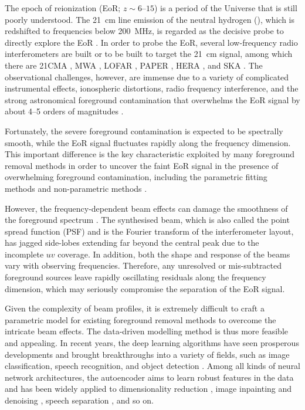 \documentclass[letters,a4paper,fleqn,usenatbib]{mnras}
\newcommand{\Hi}{\ion{H}{i}}
\begin{document}
The epoch of reionization (EoR; $z \sim \numrange{6}{15}$) is a period
of the Universe that is still poorly understood.
The \SI{21}{\cm} line emission of the neutral hydrogen (\Hi), which is
redshifted to frequencies below \SI{200}{\MHz}, is regarded as the
decisive probe to directly explore the EoR
\citep[see][for reviews]{furlanetto2006rev,furlanetto2016rev}.
In order to probe the EoR, several low-frequency radio interferometers
are built or to be built to target the \SI{21}{\cm} signal, among which
there are 21CMA \citep{zheng2016}, MWA \citep{tingay2013},
LOFAR \citep{vanHaarlem2013}, PAPER \citep{parsons2010},
HERA \citep{deboer2017}, and SKA \citep{koopmans2015rev}.
The observational challenges, however, are immense due to a variety of
complicated instrumental effects, ionospheric distortions, radio frequency
interference, and the strong astronomical foreground contamination that
overwhelms the EoR signal by about \numrange{4}{5} orders of magnitudes
\citep[see][for a review]{morales2010rev}.

Fortunately, the severe foreground contamination is expected to be
spectrally smooth, while the EoR signal fluctuates rapidly along the
frequency dimension.
This important difference is the key characteristic exploited by many
foreground removal methods in order to uncover the faint EoR signal in
the presence of overwhelming foreground contamination, including the
parametric fitting methods \citep[e.g.,][]{wang2006,liu2009fgrm,wang2013}
and non-parametric methods \citep[e.g.,][]{harker2009,chapman2013,mertens2018}.

However, the frequency-dependent beam effects can damage the smoothness
of the foreground spectrum \citep{liu2009ps}.
The synthesised beam, which is also called the point spread function (PSF)
and is the Fourier transform of the interferometer layout, has jagged
side-lobes extending far beyond the central peak due to the incomplete
$uv$ coverage.
In addition, both the shape and response of the beams vary with
observing frequencies.
Therefore, any unresolved or mis-subtracted foreground sources leave
rapidly oscillating residuals along the frequency dimension, which may
seriously compromise the separation of the EoR signal.

Given the complexity of beam profiles, it is extremely difficult to
craft a parametric model for existing foreground removal methods to
overcome the intricate beam effects.
The data-driven modelling method is thus more feasible and appealing.
In recent years, the deep learning algorithms have seen prosperous
developments and brought breakthroughs into a variety of fields, such
as image classification, speech recognition, and object detection
\citep{lecun2015}.
Among all kinds of neural network architectures, the autoencoder
aims to learn robust features in the data \citep{vincent2008}
and has been widely applied to
dimensionality reduction \citep{hinton2006},
image inpainting and denoising \citep{suganuma2018},
speech separation \citep{grais2017}, and so on.
\end{document}
